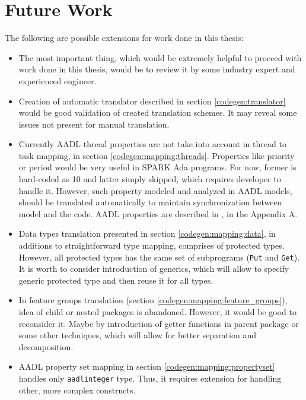 
\cleardoublepage

\chapter{Future Work}
\label{future_work}

The following are possible extensions for work done in this thesis:

\begin{itemize}
	\item The most important thing, which would be extremely helpful to proceed with work done in this thesis, would be to review it by some industry expert and experienced engineer.
	\item Creation of automatic translator described in section \ref{codegen:translator} would be good validation of created translation schemes. It may reveal some issues not present for manual translation.
	\item Currently AADL thread properties are not take into account in thread to task mapping, in section \ref{codegen:mapping:threads}. Properties like priority or period would be very useful in SPARK Ada programs. For now, former is hard-coded as 10 and latter simply skipped, which requires developer to handle it. However, such property modeled and analyzed in AADL models, should be translated automatically to maintain synchronization between model and the code. AADL properties are described in \cite{AadlBook}, in the Appendix A.
	\item Data types translation presented in section \ref{codegen:mapping:data}, in additions to straightforward type mapping, comprises of protected types. However, all protected types has the same set of subprograms (\lstinline{Put} and \lstinline{Get}). It is worth to consider introduction of generics, which will allow to specify generic protected type and then reuse it for all types.
	\item In feature groups translation (section \ref{codegen:mapping:feature_groups}), idea of child or nested packages is abandoned. However, it would be good to reconsider it. Maybe by introduction of getter functions in parent package or some other techniques, which will allow for better separation and decomposition.
	\item AADL property set mapping in section \ref{codegen:mapping:propertyset} handles only \lstinline{aadlinteger} type. Thus, it requires extension for handling other, more complex constructs.

\end{itemize}
